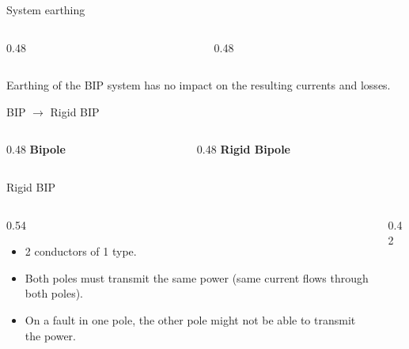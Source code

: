 \begin{frame}{System earthing}
  \begin{columns}[c,onlytextwidth]
    \begin{column}{0.48\textwidth}\centering
    \end{column}
    \begin{column}{0.48\textwidth}\centering
    \end{column}
  \end{columns}
  \vspace{0.3em}
  Earthing of the BIP system has no impact on the resulting currents and losses.
\end{frame}

\begin{frame}{BIP $\rightarrow$ Rigid BIP}
  \begin{columns}[c,onlytextwidth]
    \begin{column}{0.48\textwidth}\centering
      \textbf{Bipole}\\[0.3em]
    \end{column}
    \begin{column}{0.48\textwidth}\centering
      \textbf{Rigid Bipole}\\[0.3em]
    \end{column}
  \end{columns}
\end{frame}

\begin{frame}{Rigid BIP}
  \begin{columns}[c,onlytextwidth]
    \begin{column}{0.54\textwidth}
      \begin{itemize}
        \setlength{\itemsep}{0.4em}
        \item 2 conductors of 1 type.
        \item Both poles must transmit the same power (same current flows
              through both poles).
        \item On a fault in one pole, the other pole might not be able to
              transmit the power.
      \end{itemize}
    \end{column}
    \begin{column}{0.42\textwidth}\centering
    \end{column}
  \end{columns}
\end{frame}

